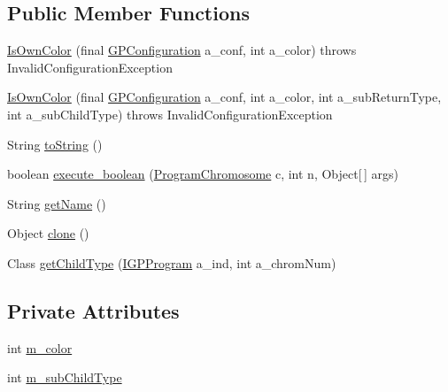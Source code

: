 \subsection*{Public Member Functions}
\begin{DoxyCompactItemize}
\item 
\hyperlink{classexamples_1_1gp_1_1tictactoe_1_1_is_own_color_a417656d8deb3f40a55d67d2bf4b13fb9}{Is\-Own\-Color} (final \hyperlink{classorg_1_1jgap_1_1gp_1_1impl_1_1_g_p_configuration}{G\-P\-Configuration} a\-\_\-conf, int a\-\_\-color)  throws Invalid\-Configuration\-Exception 
\item 
\hyperlink{classexamples_1_1gp_1_1tictactoe_1_1_is_own_color_a5b64c191d141710f3f06013be54a5caa}{Is\-Own\-Color} (final \hyperlink{classorg_1_1jgap_1_1gp_1_1impl_1_1_g_p_configuration}{G\-P\-Configuration} a\-\_\-conf, int a\-\_\-color, int a\-\_\-sub\-Return\-Type, int a\-\_\-sub\-Child\-Type)  throws Invalid\-Configuration\-Exception 
\item 
String \hyperlink{classexamples_1_1gp_1_1tictactoe_1_1_is_own_color_a21eefb1a24fbf5e720d135264657fc97}{to\-String} ()
\item 
boolean \hyperlink{classexamples_1_1gp_1_1tictactoe_1_1_is_own_color_a1e9a532ac5b89b9d4fb6e2f4b5e04cbc}{execute\-\_\-boolean} (\hyperlink{classorg_1_1jgap_1_1gp_1_1impl_1_1_program_chromosome}{Program\-Chromosome} c, int n, Object\mbox{[}$\,$\mbox{]} args)
\item 
String \hyperlink{classexamples_1_1gp_1_1tictactoe_1_1_is_own_color_a57022a72628017ba4ed789a24994bdb9}{get\-Name} ()
\item 
Object \hyperlink{classexamples_1_1gp_1_1tictactoe_1_1_is_own_color_af2fff4de2b5bac2cf1fc095d011739e7}{clone} ()
\item 
Class \hyperlink{classexamples_1_1gp_1_1tictactoe_1_1_is_own_color_ae69384ff26f87d9e554de627088d648f}{get\-Child\-Type} (\hyperlink{interfaceorg_1_1jgap_1_1gp_1_1_i_g_p_program}{I\-G\-P\-Program} a\-\_\-ind, int a\-\_\-chrom\-Num)
\end{DoxyCompactItemize}
\subsection*{Private Attributes}
\begin{DoxyCompactItemize}
\item 
int \hyperlink{classexamples_1_1gp_1_1tictactoe_1_1_is_own_color_af546abf4132ca7d0fcb093b4a9b04f00}{m\-\_\-color}
\item 
int \hyperlink{classexamples_1_1gp_1_1tictactoe_1_1_is_own_color_a75d57d0cacb2a9af720e2c63b1827f00}{m\-\_\-sub\-Child\-Type}
\end{DoxyCompactItemize}
